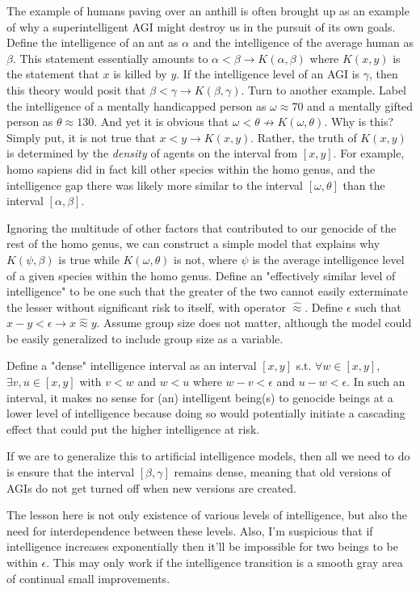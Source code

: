 \documentclass{article}[10pt]
\begin{document}
The example of humans paving over an anthill is often brought up as an example of why a superintelligent AGI might destroy us in the pursuit of its own goals. Define the intelligence of an ant as $\alpha$ and the intelligence of the average human as $\beta$.
This statement essentially amounts to $\alpha < \beta \rightarrow K(\alpha, \beta)$ where $K(x,y)$ is the statement that $x$ is killed by $y$.
If the intelligence level of an AGI is $\gamma$, then this theory would posit that $\beta < \gamma \rightarrow K(\beta, \gamma)$.
Turn to another example.
Label the intelligence of a mentally handicapped person as $\omega \approx 70$ and a mentally gifted person as $\theta \approx 130$.
And yet it is obvious that $\omega < \theta \not \rightarrow K(\omega, \theta)$.
Why is this?
Simply put, it is not true that $x < y \rightarrow K(x,y)$.
Rather, the truth of $K(x,y)$ is determined by the \textit{density} of agents on the interval from $[x,y]$. 
For example, homo sapiens did in fact kill other species within the homo genus, and the intelligence gap there was likely more similar to the interval $[\omega, \theta]$ than the interval $[\alpha, \beta]$.\par

Ignoring the multitude of other factors that contributed to our genocide of the rest of the homo genus, we can construct a simple model that explains why $K(\psi, \beta)$ is true while $K(\omega, \theta)$ is not, where $\psi$ is the average intelligence level of a given species within the homo genus.
Define an "effectively similar level of intelligence" to be one such that the greater of the two cannot easily exterminate the lesser without significant risk to itself, with operator $\hat{\approx}$. Define $\epsilon$ such that $x - y < \epsilon \rightarrow x \hat{\approx} y$.
Assume group size does not matter, although the model could be easily generalized to include group size as a variable.\par 

Define a "dense" intelligence interval as an interval $[x,y]$ s.t. $\forall w \in [x,y]$, $\exists v, u \in [x,y]$ with $v < w$ and $w < u$ where $w - v < \epsilon$ and $u - w < \epsilon$.
In such an interval, it makes no sense for (an) intelligent being(s) to genocide beings at a lower level of intelligence because doing so would potentially initiate a cascading effect that could put the higher intelligence at risk.\par

If we are to generalize this to artificial intelligence models, then all we need to do is ensure that the interval $[\beta, \gamma]$ remains dense, meaning that old versions of AGIs do not get turned off when new versions are created.\par

The lesson here is not only existence of various levels of intelligence, but also the need for interdependence between these levels.
Also, I'm suspicious that if intelligence increases exponentially then it'll be impossible for two beings to be within $\epsilon$.
This may only work if the intelligence transition is a smooth gray area of continual small improvements.
\end{document}
